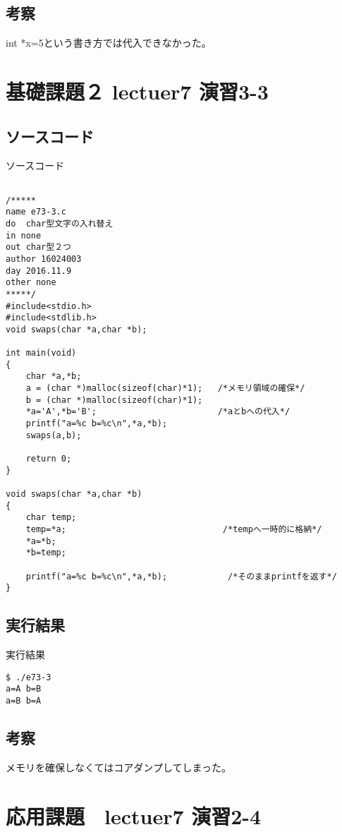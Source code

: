 \documentclass[a4j,titlepage]{jarticle}
\begin{document}
\subsection{考察}
int *x=5という書き方では代入できなかった。

\section{基礎課題２ lectuer7 演習3-3}
\subsection{ソースコード}
\begin{breakitembox}[l]{ソースコード}
\begin{verbatim}

/*****
name e73-3.c
do  char型文字の入れ替え
in none
out char型２つ
author 16024003
day 2016.11.9
other none 
*****/
#include<stdio.h>
#include<stdlib.h>
void swaps(char *a,char *b);

int main(void)
{
    char *a,*b;    
    a = (char *)malloc(sizeof(char)*1);   /*メモリ領域の確保*/
    b = (char *)malloc(sizeof(char)*1);
    *a='A',*b='B';                        /*aとbへの代入*/
    printf("a=%c b=%c\n",*a,*b);
    swaps(a,b);

    return 0;
}

void swaps(char *a,char *b)
{
    char temp;
    temp=*a;                               /*tempへ一時的に格納*/
    *a=*b;
    *b=temp;

    printf("a=%c b=%c\n",*a,*b);            /*そのままprintfを返す*/
}
\end{verbatim}
\end{breakitembox}

\subsection{実行結果}
\begin{itembox}[l]{実行結果}
\begin{verbatim}
$ ./e73-3
a=A b=B
a=B b=A
\end{verbatim}
\end{itembox}

\subsection{考察}
メモリを確保しなくてはコアダンプしてしまった。

\section{応用課題　lectuer7 演習2-4}
\end{document}

